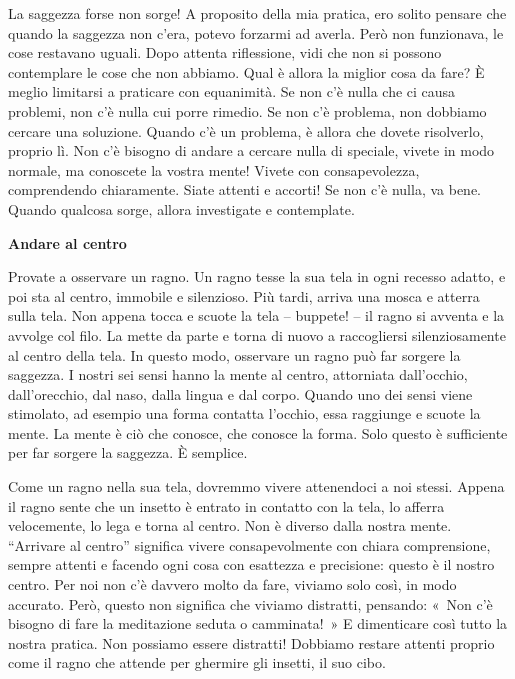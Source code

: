 La saggezza forse non sorge! A proposito della mia pratica, ero solito
pensare che quando la saggezza non c'era, potevo forzarmi ad averla.
Però non funzionava, le cose restavano uguali. Dopo attenta riflessione,
vidi che non si possono contemplare le cose che non abbiamo. Qual è
allora la miglior cosa da fare? È meglio limitarsi a praticare con
equanimità. Se non c'è nulla che ci causa problemi, non c'è nulla cui
porre rimedio. Se non c'è problema, non dobbiamo cercare una soluzione.
Quando c'è un problema, è allora che dovete risolverlo, proprio lì. Non
c'è bisogno di andare a cercare nulla di speciale, vivete in modo
normale, ma conoscete la vostra mente! Vivete con consapevolezza,
comprendendo chiaramente. Siate attenti e accorti! Se non c'è nulla, va
bene. Quando qualcosa sorge, allora investigate e contemplate.

\textbf{Andare al centro}

Provate a osservare un ragno. Un ragno tesse la sua tela in ogni recesso
adatto, e poi sta al centro, immobile e silenzioso. Più tardi, arriva
una mosca e atterra sulla tela. Non appena tocca e scuote la tela --
buppete! -- il ragno si avventa e la avvolge col filo. La mette da parte
e torna di nuovo a raccogliersi silenziosamente al centro della tela. In
questo modo, osservare un ragno può far sorgere la saggezza. I nostri
sei sensi hanno la mente al centro, attorniata dall'occhio,
dall'orecchio, dal naso, dalla lingua e dal corpo. Quando uno dei sensi
viene stimolato, ad esempio una forma contatta l'occhio, essa raggiunge
e scuote la mente. La mente è ciò che conosce, che conosce la forma.
Solo questo è sufficiente per far sorgere la saggezza. È semplice.

Come un ragno nella sua tela, dovremmo vivere attenendoci a noi stessi.
Appena il ragno sente che un insetto è entrato in contatto con la tela,
lo afferra velocemente, lo lega e torna al centro. Non è diverso dalla
nostra mente. ``Arrivare al centro'' significa vivere consapevolmente
con chiara comprensione, sempre attenti e facendo ogni cosa con
esattezza e precisione: questo è il nostro centro. Per noi non c'è
davvero molto da fare, viviamo solo così, in modo accurato. Però, questo
non significa che viviamo distratti, pensando: «~Non c'è bisogno di fare
la meditazione seduta o camminata!~» E dimenticare così tutto la nostra
pratica. Non possiamo essere distratti! Dobbiamo restare attenti proprio
come il ragno che attende per ghermire gli insetti, il suo cibo.

